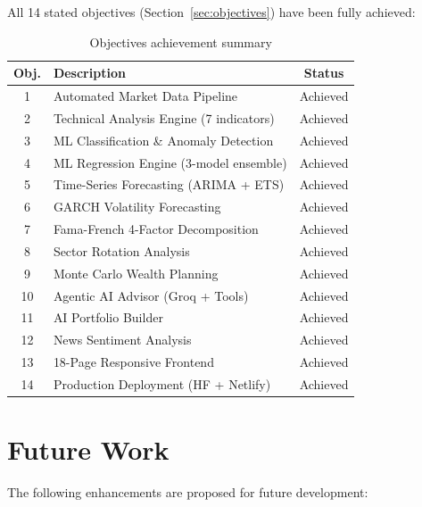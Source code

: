 \documentclass[12pt, a4paper, oneside]{report}
\begin{document}
All 14 stated objectives (Section~\ref{sec:objectives}) have been fully achieved:

\begin{table}[H]
\centering
\caption{Objectives achievement summary}
\label{tab:objectives_achieved}
\begin{tabularx}{\textwidth}{@{}c X c@{}}
\toprule
\textbf{Obj.} & \textbf{Description} & \textbf{Status} \\
\midrule
1 & Automated Market Data Pipeline & Achieved \\
2 & Technical Analysis Engine (7 indicators) & Achieved \\
3 & ML Classification \& Anomaly Detection & Achieved \\
4 & ML Regression Engine (3-model ensemble) & Achieved \\
5 & Time-Series Forecasting (ARIMA + ETS) & Achieved \\
6 & GARCH Volatility Forecasting & Achieved \\
7 & Fama-French 4-Factor Decomposition & Achieved \\
8 & Sector Rotation Analysis & Achieved \\
9 & Monte Carlo Wealth Planning & Achieved \\
10 & Agentic AI Advisor (Groq + Tools) & Achieved \\
11 & AI Portfolio Builder & Achieved \\
12 & News Sentiment Analysis & Achieved \\
13 & 18-Page Responsive Frontend & Achieved \\
14 & Production Deployment (HF + Netlify) & Achieved \\
\bottomrule
\end{tabularx}
\end{table}

\section{Future Work}
\label{sec:future_work}

The following enhancements are proposed for future development:
\end{document}
